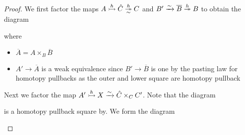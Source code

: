 \begin{prop}
\begin{proof}
        We first factor the maps $A\xtailrightarrow{h}\hat{C}\xtwoheadrightarrow[\sim]{h} C$ and $B'\xrightarrow{\sim}\overline{B}\xtwoheadrightarrow{h} B$ to obtain the diagram
        \begin{center}
        \end{center}
        where 
        \begin{itemize}
            \item $\overline{A}=A\times_{B}\overline{B}$
            \item $A'\to \overline{A}$ is a weak equivalence since $B'\to\overline{B}$ is one by the pasting law for homotopy pullbacks as the outer and lower square are homotopy pullback
        \end{itemize}
        Next we factor the map $A'\xtailrightarrow{h}X\xrightarrow{\sim}\hat{C}\times_CC'$. 
        Note that the diagram 
        \begin{center}
        \end{center}
        is a homotopy pullback square by.
        We form the diagram
        \begin{center}
\end{center}
\end{proof}
\end{prop}
